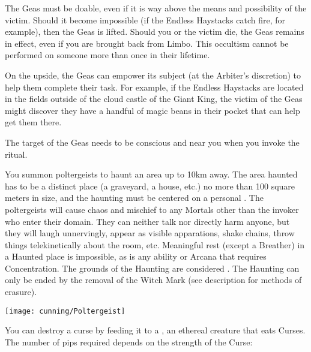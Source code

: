 The Geas must be doable, even if it is way above the means and possibility of the victim.  Should it become impossible (if the Endless Haystacks catch fire, for example), then the Geas is lifted.  Should you or the victim die, the Geas remains in effect, even if you are brought back from Limbo. This occultism cannot be performed on someone more than once in their lifetime.

On the upside, the Geas can empower its subject (at the Arbiter's discretion) to help them complete their task.  For example, if the Endless Haystacks are located in the fields outside of the cloud castle of the Giant King, the victim of the Geas might discover they have a handful of magic beans in their pocket that can help get them there.

The target of the Geas needs to be conscious and near you when you invoke the ritual.


\OCCULT[
  Name=Haunt,
  Link=occultism-haunt,
  Pips=5,
  Time=Days
]

You summon poltergeists to haunt an area up to 10km away. The area haunted has to be a distinct place (a graveyard, a house, etc.) no more than 100 square meters in size, and the haunting must be centered on a personal . The poltergeists will cause chaos and mischief to any Mortals other than the invoker who enter their domain. They can neither talk nor directly harm anyone, but they will laugh unnervingly, appear as visible apparations, shake chains, throw things telekinetically about the room, etc. Meaningful rest (except a Breather) in a Haunted place is impossible, as is any ability or Arcana that requires Concentration. The grounds of the Haunting are considered . The Haunting can only be ended by the removal of the Witch Mark (see description for methods of erasure).

\begin{center}
\texttt{[image: cunning/Poltergeist]}
\end{center} 

\cbreak


\OCCULT[
  Name=Hekaphage,
  Link=occultism-hekaphage,
  Pips=1+,
  Time=Days
]



You can destroy a curse by feeding it to a , an ethereal creature that eats Curses.  The number of pips required depends on the strength of the Curse:

